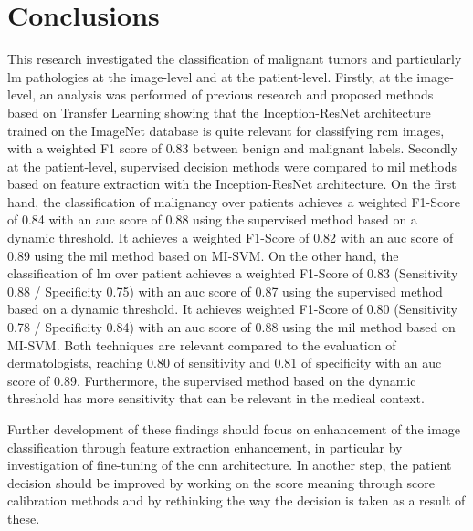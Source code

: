 \documentclass[journal,article,submit,moreauthors,pdftex, applsci]{Definitions/mdpi}
\begin{document}
\section{Conclusions}
\label{sec:conclusions}
This research investigated the classification of malignant tumors and particularly \ac{lm} pathologies at the image-level and at the patient-level. Firstly, at the image-level, an analysis was performed of previous research and proposed methods based on Transfer Learning showing that the Inception-ResNet architecture trained on the ImageNet database is quite relevant for classifying \ac{rcm} images, with a weighted F1 score of 0.83 between benign and malignant labels. Secondly at the patient-level, supervised decision methods were compared to \ac{mil} methods based on feature extraction with the Inception-ResNet architecture. On the first hand, the classification of malignancy over patients achieves a weighted F1-Score of 0.84 with an \ac{auc} score of 0.88 using the supervised method based on a dynamic threshold. It achieves a weighted F1-Score of 0.82 with an \ac{auc} score of 0.89 using the \ac{mil} method based on MI-SVM. On the other hand, the classification of \ac{lm} over patient achieves a weighted F1-Score of 0.83 (Sensitivity 0.88 / Specificity 0.75) with an \ac{auc} score of 0.87 using the supervised method based on a dynamic threshold. It achieves weighted F1-Score of 0.80 (Sensitivity 0.78 / Specificity 0.84) with an \ac{auc} score of 0.88 using the \ac{mil} method based on MI-SVM. Both techniques are relevant compared to the evaluation of dermatologists, reaching 0.80 of sensitivity and 0.81 of specificity with an \ac{auc} score of 0.89. Furthermore, the supervised method based on the dynamic threshold has more sensitivity that can be relevant in the medical context.\par
Further development of these findings should focus on enhancement of the image classification through feature extraction enhancement, in particular by investigation of fine-tuning of the \ac{cnn} architecture. In another step, the patient decision should be improved by working on the score meaning through score calibration methods and by rethinking the way the decision is taken as a result of these.\par

\vspace{6pt} 

\end{document}
